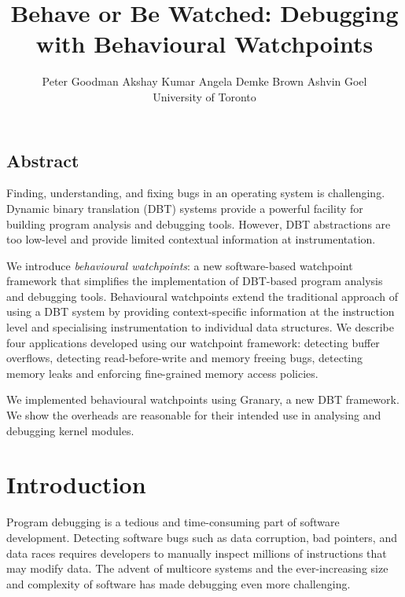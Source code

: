 \documentclass[letterpaper,twocolumn,10pt]{article}
\begin{document}
\date{}

\title{\Large \bf Behave or Be Watched: Debugging with Behavioural Watchpoints}

\author{
{\rm Peter Goodman} \hspace{1.5em} {\rm Akshay Kumar} \hspace{1.5em} {\rm Angela Demke Brown} \hspace{1.5em} {\rm Ashvin Goel}\\
University of Toronto
} %


\maketitle
\subsection*{Abstract}
Finding, understanding, and fixing bugs in an operating system is challenging. Dynamic binary translation (DBT) systems provide a powerful facility for building program analysis and debugging tools. However, DBT abstractions are too low-level and provide limited contextual information at instrumentation.

We introduce \emph{behavioural watchpoints}: a new software-based watchpoint framework that simplifies the implementation of DBT-based program analysis and debugging tools. Behavioural watchpoints extend the traditional approach of using a DBT system by providing context-specific information at the instruction level and specialising instrumentation to individual data structures.  We describe four applications developed using our watchpoint framework: detecting buffer overflows, detecting read-before-write and memory freeing bugs, detecting memory leaks and enforcing fine-grained memory access policies.

We implemented behavioural watchpoints using Granary, a new DBT framework. We show the overheads are reasonable for their intended use in analysing and debugging kernel modules.


\section{Introduction}

Program debugging is a tedious and time-consuming part of software development. Detecting software bugs such as data corruption, bad pointers, and data races requires developers to manually inspect millions of instructions that may modify data. The advent of multicore systems and the ever-increasing size and complexity of software has made debugging even more challenging. 
\end{document}
